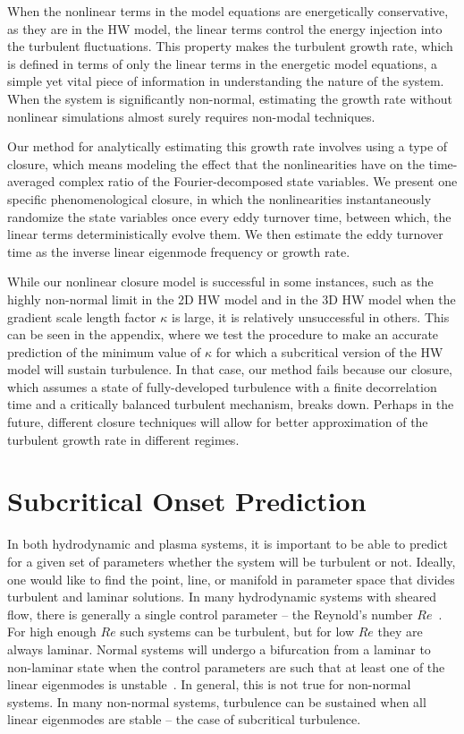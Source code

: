 \documentclass[twocolumn,showkeys,superscriptaddress]{revtex4}
\begin{document}
When the nonlinear terms in the model equations are energetically conservative, as they are in the HW model, 
the linear terms control the energy injection into the turbulent fluctuations.
This property makes the turbulent growth rate, which is defined in terms of only the linear terms in the energetic model equations, a simple yet vital piece of information
in understanding the nature of the system. When the system is significantly non-normal, estimating the growth rate without nonlinear simulations almost surely requires non-modal techniques.

Our method for analytically estimating this growth rate involves using a type of closure, which means modeling the effect that the nonlinearities have
on the time-averaged complex ratio of the Fourier-decomposed state variables. 
We present one specific phenomenological closure, in which the nonlinearities instantaneously randomize the state variables once every eddy turnover time, between
which, the linear terms deterministically evolve them. We then estimate the eddy turnover time as the inverse linear eigenmode frequency or growth rate.

While our nonlinear closure model is successful in some instances, such as the highly non-normal limit in the 2D HW model and in the 3D HW model when the gradient scale length factor $\kappa$ is large,
it is relatively unsuccessful in others. This can be seen in the appendix, where we test the procedure to make an accurate prediction of the minimum value of $\kappa$ for which a subcritical version
of the HW model will sustain turbulence. In that case, our method fails because our closure, which assumes a state of fully-developed turbulence with a finite decorrelation time and a critically
balanced turbulent mechanism, breaks down.
Perhaps in the future, different closure techniques will allow for better approximation of the turbulent growth rate in different regimes.


\appendix
\section{Subcritical Onset Prediction}

In both hydrodynamic and plasma systems, it is important to be able to predict for a given set of parameters whether the system will be turbulent or not.
Ideally, one would like to find the point, line, or manifold in parameter space that divides turbulent and laminar solutions.
In many hydrodynamic systems with sheared flow, there is generally a single control parameter -- the Reynold's number $Re$~\cite{drazin1981}. For high enough $Re$ such systems
can be turbulent, but for low $Re$ they are always laminar.
Normal systems will undergo a bifurcation from a laminar to non-laminar state when the control parameters are such that at least one of the linear eigenmodes is unstable~\cite{grossmann2000}.
In general, this is not true for non-normal systems. In many non-normal systems, turbulence can be sustained when all linear eigenmodes are stable -- the case of subcritical turbulence. 
\end{document}
